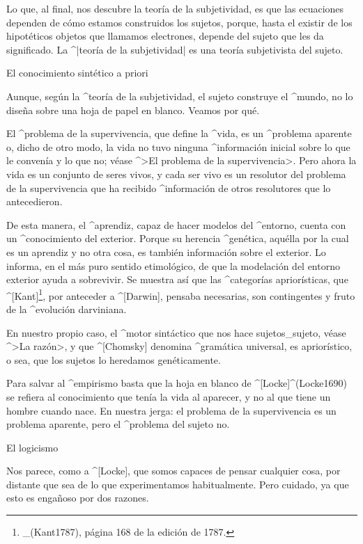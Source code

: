 
Lo que, al final, nos descubre la teoría de la subjetividad, es que las
ecuaciones dependen de cómo estamos construidos los sujetos, porque,
hasta el existir de los hipotéticos objetos que llamamos electrones,
depende del sujeto que les da significado. La ^|teoría de la
subjetividad| es una teoría subjetivista del sujeto.


\Section El conocimiento sintético a priori

Aunque, según la ^{teoría de la subjetividad}, el sujeto construye el
^{mundo}, no lo diseña sobre una hoja de papel en blanco. Veamos por
qué.

El ^{problema de la supervivencia}, que define la ^{vida}, es un
^{problema aparente} o, dicho de otro modo, la vida no tuvo ninguna
^{información} inicial sobre lo que le convenía y lo que no; véase ^>El
problema de la supervivencia>. Pero ahora la vida es un conjunto de
seres vivos, y cada ser vivo es un resolutor del problema de la
supervivencia que ha recibido ^{información} de otros resolutores que lo
antecedieron.

De esta manera, el ^{aprendiz}, capaz de hacer modelos del ^{entorno},
cuenta con un ^{conocimiento}  del exterior. Porque su
herencia ^{genética}, aquélla por la cual es un aprendiz y no otra cosa,
es también información sobre el exterior. Lo informa, en el más puro
sentido etimológico, de que la modelación del entorno exterior ayuda a
sobrevivir. Se muestra así que las ^{categorías} apriorísticas, que
^[Kant]\footnote{_(Kant1787), página 168 de la edición de 1787.}, por
anteceder a ^[Darwin], pensaba necesarias, son contingentes y fruto de
la ^{evolución} darviniana.

En nuestro propio caso, el ^{motor sintáctico} que nos hace
sujetos_{sujeto}, véase ^>La razón>, y que ^[Chomsky] denomina
^{gramática universal}, es apriorístico, o sea, que los sujetos lo
heredamos genéticamente.

Para salvar al ^{empirismo} basta que la hoja en blanco de
^[Locke]^(Locke1690) se refiera al conocimiento que tenía la vida al
aparecer, y no al que tiene un hombre cuando nace. En nuestra jerga: el
problema de la supervivencia es un problema aparente, pero el ^{problema
del sujeto} no.


\Section El logicismo

Nos parece, como a ^[Locke], que somos capaces de pensar cualquier cosa,
por distante que sea de lo que experimentamos habitualmente. Pero
cuidado, ya que esto es engañoso por dos razones.

